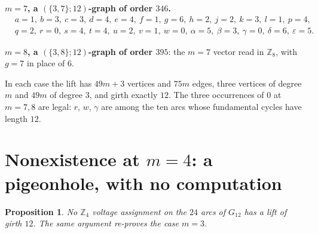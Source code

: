 \documentclass[11pt]{amsart}
\newtheorem{proposition}[theorem]{Proposition}
\theoremstyle{remark}
\newcommand{\Gt}{G_{12}}
\begin{document}
\noindent\textbf{$m = 7$, a $(\{3,7\};12)$-graph of order $346$.}
\[
\begin{aligned}
&a{=}1,\ b{=}3,\ c{=}3,\ d{=}4,\ e{=}4,\ f{=}1,\ g{=}6,\ h{=}2,
 \ j{=}2,\ k{=}3,\ l{=}1,\ p{=}4,\\
&q{=}2,\ r{=}0,\ s{=}4,\ t{=}4,\ u{=}2,\ v{=}1,\ w{=}0,\ \alpha{=}5,
 \ \beta{=}3,\ \gamma{=}0,\ \delta{=}6,\ \varepsilon{=}5.
\end{aligned}
\]

\noindent\textbf{$m = 8$, a $(\{3,8\};12)$-graph of order $395$}: the $m=7$
vector read in $\mathbb{Z}_8$, with $g = 7$ in place of $6$.

\medskip
In each case the lift has $49m+3$ vertices and $75m$ edges, three vertices of
degree $m$ and $49m$ of degree $3$, and girth exactly $12$. The three
occurrences of $0$ at $m=7,8$ are legal: $r$, $w$, $\gamma$ are among the ten
arcs whose fundamental cycles have length $12$.

\section{Nonexistence at $m = 4$: a pigeonhole, with no computation}
\label{sec:m4}

\begin{proposition}\label{prop:m4}
No $\mathbb{Z}_4$ voltage assignment on the $24$ arcs of $\Gt$ has a lift of
girth $12$. The same argument re-proves the case $m = 3$.
\end{proposition}
\end{document}
